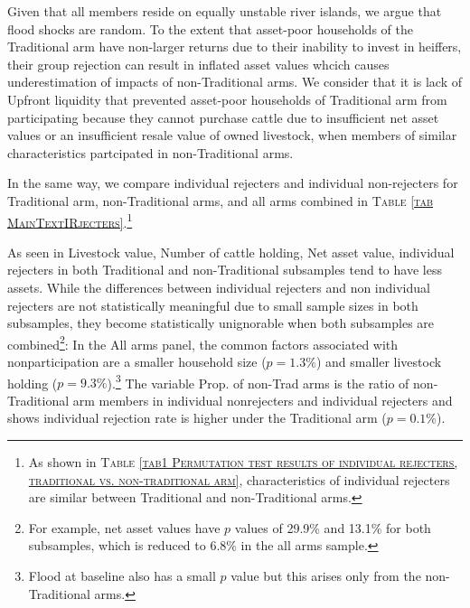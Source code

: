 	Given that all members reside on equally unstable river islands, we argue that flood shocks are random.  To the extent that asset-poor households of the \textsf{Traditional} arm have non-larger returns due to their inability to invest in heiffers, their group rejection can result in inflated asset values whcich causes underestimation of impacts of non-\textsf{Traditional} arms. We consider that it is lack of \textsf{Upfront} liquidity that prevented asset-poor households of \textsf{Traditional} arm from participating because they cannot purchase cattle due to insufficient net asset values or an insufficient resale value of owned livestock, when members of similar characteristics partcipated in non-\textsf{Traditional} arms. 

	In the same way, we compare individual rejecters and individual non-rejecters for \textsf{Traditional} arm, non-\textsf{Traditional} arms, and all arms combined in \textsc{\normalsize Table \ref{tab MainTextIRjecters}}.\footnote{As shown in \textsc{Table \ref{tab1 Permutation test results of individual rejecters, traditional vs. non-traditional arm}}, characteristics of individual rejecters are similar between \textsf{Traditional} and non-\textsf{Traditional} arms. } 

	As seen in \textsf{Livestock value, Number of cattle holding, Net asset value}, individual rejecters in both \textsf{Traditional} and non-\textsf{Traditional} subsamples tend to have less assets. While the differences between individual rejecters and non individual rejecters are not statistically meaningful due to small sample sizes in both subsamples, they become statistically unignorable when both subsamples are combined\footnote{For example, net asset values have $p$ values of 29.9\% and 13.1\% for both subsamples, which is reduced to 6.8\% in the all arms sample. }: In the \textsf{All arms} panel, the common factors associated with nonparticipation are a smaller household size ($p=1.3\%$) and smaller livestock holding ($p=9.3\%$).\footnote{\textsf{Flood at baseline} also has a small $p$ value but this arises only from the non-\textsf{Traditional} arms. } The variable \textsf{Prop. of non-Trad arms} is the ratio of non-\textsf{Traditional} arm members in individual nonrejecters and individual rejecters and shows individual rejection rate is higher under the \textsf{Traditional} arm ($p=0.1\%$). %

